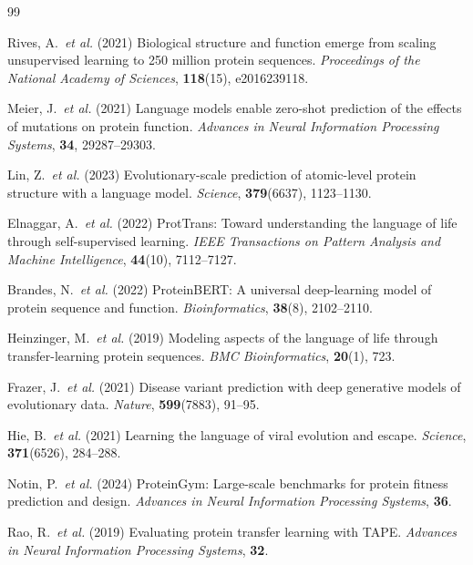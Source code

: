 \documentclass[11pt,a4paper]{article}
\begin{document}
\newpage
\begin{thebibliography}{99}

Rives, A.\ \textit{et al.} (2021)
Biological structure and function emerge from scaling unsupervised learning to 250
million protein sequences.
\textit{Proceedings of the National Academy of Sciences}, \textbf{118}(15), e2016239118.

Meier, J.\ \textit{et al.} (2021)
Language models enable zero-shot prediction of the effects of mutations on protein
function.
\textit{Advances in Neural Information Processing Systems}, \textbf{34}, 29287--29303.

Lin, Z.\ \textit{et al.} (2023)
Evolutionary-scale prediction of atomic-level protein structure with a language model.
\textit{Science}, \textbf{379}(6637), 1123--1130.

Elnaggar, A.\ \textit{et al.} (2022)
ProtTrans: Toward understanding the language of life through self-supervised learning.
\textit{IEEE Transactions on Pattern Analysis and Machine Intelligence}, \textbf{44}(10),
7112--7127.

Brandes, N.\ \textit{et al.} (2022)
ProteinBERT: A universal deep-learning model of protein sequence and function.
\textit{Bioinformatics}, \textbf{38}(8), 2102--2110.

Heinzinger, M.\ \textit{et al.} (2019)
Modeling aspects of the language of life through transfer-learning protein sequences.
\textit{BMC Bioinformatics}, \textbf{20}(1), 723.

Frazer, J.\ \textit{et al.} (2021)
Disease variant prediction with deep generative models of evolutionary data.
\textit{Nature}, \textbf{599}(7883), 91--95.

Hie, B.\ \textit{et al.} (2021)
Learning the language of viral evolution and escape.
\textit{Science}, \textbf{371}(6526), 284--288.

Notin, P.\ \textit{et al.} (2024)
ProteinGym: Large-scale benchmarks for protein fitness prediction and design.
\textit{Advances in Neural Information Processing Systems}, \textbf{36}.

Rao, R.\ \textit{et al.} (2019)
Evaluating protein transfer learning with TAPE.
\textit{Advances in Neural Information Processing Systems}, \textbf{32}.


\end{thebibliography}
\end{document}
